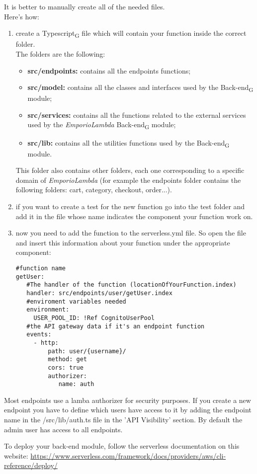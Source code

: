 It is better to manually create all of the needed files.\\
Here's how:
\begin{enumerate}
\item create a Typescript\textsubscript{G} file which will contain your function inside the correct folder.\\The folders are the following:
\begin{itemize}
\item \textbf{src/endpoints:} contains all the endpoints functions;
\item \textbf{src/model:} contains all the classes and interfaces used by the Back-end\textsubscript{G} module;
\item \textbf{src/services:} contains all the functions related to the external services used by the \textit{EmporioLambda} Back-end\textsubscript{G} module;
\item \textbf{src/lib:} contains all the utilities functions used by the Back-end\textsubscript{G} module.
\end{itemize}
This folder also contains other folders, each one corresponding to a specific domain of \textit{EmporioLambda} (for example the endpoints folder contains the following folders: cart, category, checkout, order...). 
\item if you want to create a test for the new function go into the test folder and add it in the file whose name indicates the component your function work on.
\item now you need to add the function to the serverless.yml file. So open the file and insert this information about your function under the appropriate component:
\begin{lstlisting}
#function name
getUser:
   #The handler of the function (locationOfYourFunction.index)
   handler: src/endpoints/user/getUser.index
   #enviroment variables needed
   environment:
     USER_POOL_ID: !Ref CognitoUserPool
   #the API gateway data if it's an endpoint function
   events:
     - http:
         path: user/{username}/
         method: get
         cors: true
         authorizer:
            name: auth
\end{lstlisting}
\end{enumerate}

Most endpoints use a lamba authorizer for security purposes. If you create a new endpoint you have to define which users have access to it by adding the endpoint name in the /src/lib/auth.ts file in the 'API Visibility' section. By default the admin user has access to all endpoints.

To deploy your back-end module, follow the serverless documentation on this website: \url{https://www.serverless.com/framework/docs/providers/aws/cli-reference/deploy/}